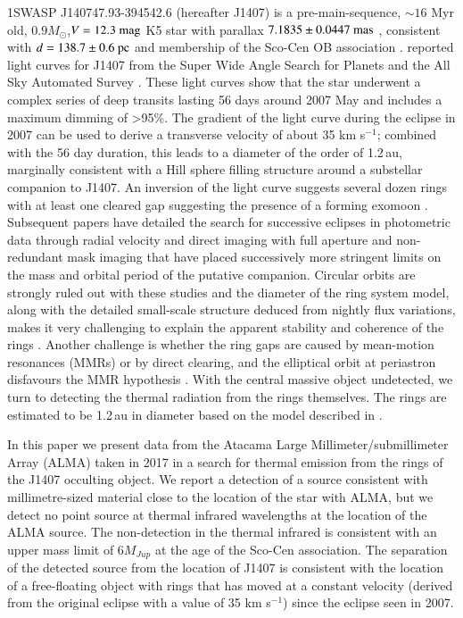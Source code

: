 \documentclass{aa} %
\newcommand{\kms}{km s$^{-1}$}
\begin{document}
1SWASP J140747.93-394542.6 (hereafter J1407) is a pre-main-sequence, $\sim 16$ Myr old, $0.9M_\odot$,$V=12.3{\rm~mag}$ K5 star with parallax $7.1835\pm 0.0447{\rm~mas}$ \citep{Gaia18}, consistent with  $d=138.7\pm 0.6{\rm~pc}$ \citep{Bailer-Jones18} and membership of the Sco-Cen OB association \citep{Mamajek12}.
%
\citet{Mamajek12} reported  light curves for J1407 from the Super Wide Angle Search for Planets \citep[SuperWASP;][]{Butters10} and the All Sky Automated Survey \citep[ASAS;][]{Pojmanski02}.
%
These light curves show that the star underwent a complex series of deep transits lasting 56 days around 2007 May and includes a maximum dimming of >95\%.
%
The gradient of the light curve during the eclipse in 2007 can be used to derive a transverse velocity of about 35 \kms{}; combined with the 56 day duration, this leads to a diameter of the order of 1.2\,au, marginally consistent with a Hill sphere filling structure around a substellar companion to J1407.
%
An inversion of the light curve suggests several dozen rings with at least one cleared gap suggesting the presence of a forming exomoon \citep{Mamajek12,vanWerkhoven14,Kenworthy15b}.
%
Subsequent papers have detailed the search for successive eclipses in photometric data \citep{Kenworthy15b,Mentel18} through radial velocity and direct imaging with full aperture and non-redundant mask imaging \citep{Kenworthy15} that have placed successively more  stringent limits on the mass and orbital period of the putative companion.
%
Circular orbits are strongly ruled out with these studies and the diameter of the ring system model, along with the detailed small-scale structure deduced from nightly flux variations, makes it very challenging to explain the apparent stability and coherence of the rings \citep{Zanazzi17,Rieder16}.
%
Another challenge is whether the ring gaps are caused by mean-motion resonances (MMRs) or by direct clearing, and the elliptical orbit at periastron disfavours the MMR hypothesis \citep{2019MNRAS.tmp..555S}.
%
With the central massive object undetected, we turn to detecting the thermal radiation from the rings themselves.
%
The rings are estimated to be 1.2\,au in diameter based on the model described in \citet{Kenworthy15b}.

In this paper we present data from the Atacama Large Millimeter/submillimeter Array (ALMA) taken in 2017 in a search for thermal emission from the rings of the J1407 occulting object.
%
We report a detection of a source consistent with millimetre-sized material close to the location of the star with ALMA, but we detect no point source at thermal infrared wavelengths at the location of the ALMA source.
%
The non-detection in the thermal infrared is consistent with an upper mass limit of $6M_{Jup}$ at the age of the Sco-Cen association.
%
The separation of the detected source from the location of J1407 is consistent with the location of a free-floating object with rings that has moved at a constant velocity (derived from the original eclipse with a value of 35 \kms{}) since the eclipse seen in 2007.
\end{document}
